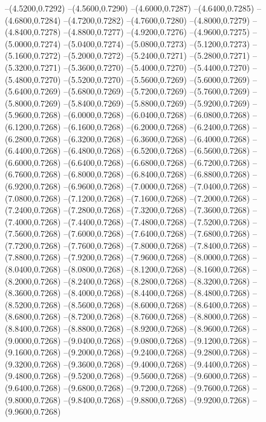 {	--(4.5200,0.7292)
	--(4.5600,0.7290)
	--(4.6000,0.7287)
	--(4.6400,0.7285)
	--(4.6800,0.7284)
	--(4.7200,0.7282)
	--(4.7600,0.7280)
	--(4.8000,0.7279)
	--(4.8400,0.7278)
	--(4.8800,0.7277)
	--(4.9200,0.7276)
	--(4.9600,0.7275)
	--(5.0000,0.7274)
	--(5.0400,0.7274)
	--(5.0800,0.7273)
	--(5.1200,0.7273)
	--(5.1600,0.7272)
	--(5.2000,0.7272)
	--(5.2400,0.7271)
	--(5.2800,0.7271)
	--(5.3200,0.7271)
	--(5.3600,0.7270)
	--(5.4000,0.7270)
	--(5.4400,0.7270)
	--(5.4800,0.7270)
	--(5.5200,0.7270)
	--(5.5600,0.7269)
	--(5.6000,0.7269)
	--(5.6400,0.7269)
	--(5.6800,0.7269)
	--(5.7200,0.7269)
	--(5.7600,0.7269)
	--(5.8000,0.7269)
	--(5.8400,0.7269)
	--(5.8800,0.7269)
	--(5.9200,0.7269)
	--(5.9600,0.7268)
	--(6.0000,0.7268)
	--(6.0400,0.7268)
	--(6.0800,0.7268)
	--(6.1200,0.7268)
	--(6.1600,0.7268)
	--(6.2000,0.7268)
	--(6.2400,0.7268)
	--(6.2800,0.7268)
	--(6.3200,0.7268)
	--(6.3600,0.7268)
	--(6.4000,0.7268)
	--(6.4400,0.7268)
	--(6.4800,0.7268)
	--(6.5200,0.7268)
	--(6.5600,0.7268)
	--(6.6000,0.7268)
	--(6.6400,0.7268)
	--(6.6800,0.7268)
	--(6.7200,0.7268)
	--(6.7600,0.7268)
	--(6.8000,0.7268)
	--(6.8400,0.7268)
	--(6.8800,0.7268)
	--(6.9200,0.7268)
	--(6.9600,0.7268)
	--(7.0000,0.7268)
	--(7.0400,0.7268)
	--(7.0800,0.7268)
	--(7.1200,0.7268)
	--(7.1600,0.7268)
	--(7.2000,0.7268)
	--(7.2400,0.7268)
	--(7.2800,0.7268)
	--(7.3200,0.7268)
	--(7.3600,0.7268)
	--(7.4000,0.7268)
	--(7.4400,0.7268)
	--(7.4800,0.7268)
	--(7.5200,0.7268)
	--(7.5600,0.7268)
	--(7.6000,0.7268)
	--(7.6400,0.7268)
	--(7.6800,0.7268)
	--(7.7200,0.7268)
	--(7.7600,0.7268)
	--(7.8000,0.7268)
	--(7.8400,0.7268)
	--(7.8800,0.7268)
	--(7.9200,0.7268)
	--(7.9600,0.7268)
	--(8.0000,0.7268)
	--(8.0400,0.7268)
	--(8.0800,0.7268)
	--(8.1200,0.7268)
	--(8.1600,0.7268)
	--(8.2000,0.7268)
	--(8.2400,0.7268)
	--(8.2800,0.7268)
	--(8.3200,0.7268)
	--(8.3600,0.7268)
	--(8.4000,0.7268)
	--(8.4400,0.7268)
	--(8.4800,0.7268)
	--(8.5200,0.7268)
	--(8.5600,0.7268)
	--(8.6000,0.7268)
	--(8.6400,0.7268)
	--(8.6800,0.7268)
	--(8.7200,0.7268)
	--(8.7600,0.7268)
	--(8.8000,0.7268)
	--(8.8400,0.7268)
	--(8.8800,0.7268)
	--(8.9200,0.7268)
	--(8.9600,0.7268)
	--(9.0000,0.7268)
	--(9.0400,0.7268)
	--(9.0800,0.7268)
	--(9.1200,0.7268)
	--(9.1600,0.7268)
	--(9.2000,0.7268)
	--(9.2400,0.7268)
	--(9.2800,0.7268)
	--(9.3200,0.7268)
	--(9.3600,0.7268)
	--(9.4000,0.7268)
	--(9.4400,0.7268)
	--(9.4800,0.7268)
	--(9.5200,0.7268)
	--(9.5600,0.7268)
	--(9.6000,0.7268)
	--(9.6400,0.7268)
	--(9.6800,0.7268)
	--(9.7200,0.7268)
	--(9.7600,0.7268)
	--(9.8000,0.7268)
	--(9.8400,0.7268)
	--(9.8800,0.7268)
	--(9.9200,0.7268)
	--(9.9600,0.7268)
}
